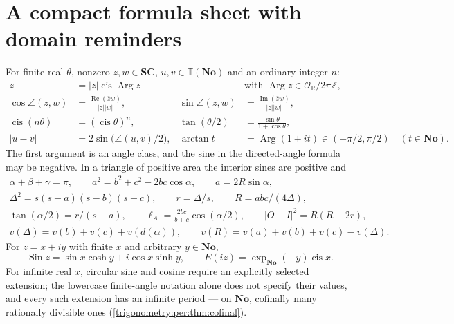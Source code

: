 \documentclass[11pt,letterpaper]{article}
\numberwithin{equation}{section}
\theoremstyle{definition}
\theoremstyle{remark}
\newcommand{\No}{\mathbf{No}}
\newcommand{\SC}{\mathbf{SC}}
\newcommand{\R}{\mathbb R}
\newcommand{\Z}{\mathbb Z}
\newcommand{\OO}{\mathcal O}
\newcommand{\TT}{\mathbb T}
\newcommand{\re}{\operatorname{Re}}
\newcommand{\im}{\operatorname{Im}}
\newcommand{\cis}{\operatorname{cis}}
\newcommand{\Arg}{\operatorname{Arg}}
\newcommand{\Sin}{\operatorname{Sin}}
\newcommand{\ang}[2]{\angle(#1,#2)}
\begin{document}
\appendix
\section{A compact formula sheet with domain reminders}\label{trigonometry:app:formulas}
For finite real $\theta$, nonzero $z,w\in\SC$, $u,v\in\TT(\No)$ and an ordinary integer $n$:
\begin{align*}
 z&=|z|\cis\Arg z&&\text{with }\Arg z\in\OO_{\R}/2\pi\Z,\\
 \cos\ang zw&=\frac{\re(\bar zw)}{|z||w|},&
 \sin\ang zw&=\frac{\im(\bar zw)}{|z||w|},\\
 \cis(n\theta)&=(\cis\theta)^n,&
 \tan(\theta/2)&=\frac{\sin\theta}{1+\cos\theta},\\
 |u-v|&=2\sin\bigl(\ang uv/2\bigr),&
 \arctan t&=\Arg(1+it)\in(-\pi/2,\pi/2)\quad(t\in\No).
\end{align*}
The first argument is an angle class, and the sine in the directed-angle formula may be negative.
In a triangle of positive area the interior sines are positive and
\begin{gather*}
 \alpha+\beta+\gamma=\pi,\qquad a^2=b^2+c^2-2bc\cos\alpha,\qquad a=2R\sin\alpha,\\
 \Delta^2=s(s-a)(s-b)(s-c),\qquad r=\Delta/s,\qquad R=abc/(4\Delta),\\
 \tan(\alpha/2)=r/(s-a),\qquad \ell_A=\tfrac{2bc}{b+c}\cos(\alpha/2),\qquad
 |O-I|^2=R(R-2r),\\
 v(\Delta)=v(b)+v(c)+v(d(\alpha)),\qquad v(R)=v(a)+v(b)+v(c)-v(\Delta).
\end{gather*}
For $z=x+iy$ with finite $x$ and arbitrary $y\in\No$,
\[
 \Sin z=\sin x\cosh y+i\cos x\sinh y,\qquad E(iz)=\exp_{\No}(-y)\cis x .
\]
For infinite real $x$, circular sine and cosine require an explicitly selected extension; the
lowercase finite-angle notation alone does not specify their values, and every such extension has
an infinite period --- on $\No$, cofinally many rationally divisible ones
(\cref{trigonometry:per:thm:cofinal}).
\end{document}
